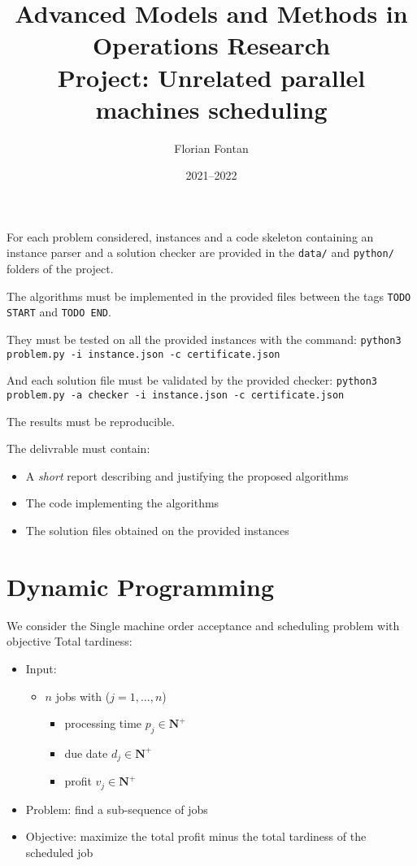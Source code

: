 \documentclass[a4paper,twocolumn]{article}
\author{Florian Fontan}
\title{Advanced Models and Methods in Operations Research \\ Project: Unrelated parallel machines scheduling}
\date{2021--2022}
\newcommand{\N}{\mathbf{N}}
\begin{document}
\maketitle

For each problem considered, instances and a code skeleton containing an instance parser and a solution checker are provided in the \texttt{data/} and \texttt{python/} folders of the project.

The algorithms must be implemented in the provided files between the tags \texttt{TODO START} and \texttt{TODO END}.

They must be tested on all the provided instances with the command:
\texttt{python3 problem.py -i instance.json -c certificate.json}

And each solution file must be validated by the provided checker:
\texttt{python3 problem.py -a checker -i instance.json -c certificate.json}

The results must be reproducible.

\bigskip

The delivrable must contain:
\begin{itemize}
  \item A \emph{short} report describing and justifying the proposed algorithms
  \item The code implementing the algorithms
  \item The solution files obtained on the provided instances
\end{itemize}

\section{Dynamic Programming}

We consider the Single machine order acceptance and scheduling problem with objective Total tardiness:
\begin{itemize}
  \item Input:
    \begin{itemize}
      \item $n$ jobs with ($j = 1, \dots, n$)
        \begin{itemize}
          \item processing time $p_j \in \N^+$
          \item due date $d_j \in \N^+$
          \item profit $v_j \in \N^+$
        \end{itemize}
    \end{itemize}
  \item Problem: find a sub-sequence of jobs
  \item Objective: maximize the total profit minus the total tardiness of the scheduled job
\end{itemize}
\end{document}
